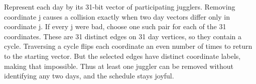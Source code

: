 Represent each day by its 31-bit vector of participating jugglers. Removing coordinate j causes a collision exactly when two day vectors differ only in coordinate j. If every j were bad, choose one such pair for each of the 31 coordinates. These are 31 distinct edges on 31 day vertices, so they contain a cycle. Traversing a cycle flips each coordinate an even number of times to return to the starting vector. But the selected edges have distinct coordinate labels, making that impossible. Thus at least one juggler can be removed without identifying any two days, and the schedule stays joyful.
